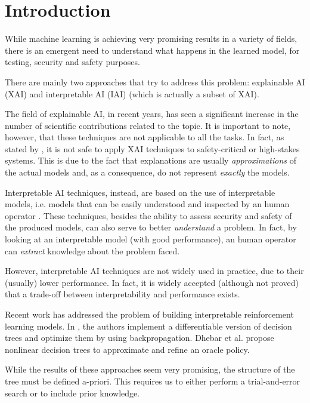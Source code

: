 \documentclass[review,english]{elsarticle}
\begin{document}
\section{Introduction}
\label{sec:intro}
While machine learning is achieving very promising results in a variety of fields, there is an emergent need to understand what happens in the learned model, for testing, security and safety purposes.

There are mainly two approaches that try to address this problem: explainable AI (XAI) and interpretable AI (IAI) (which is actually a subset of XAI).

The field of explainable AI, in recent years, has seen a significant increase in the number of scientific contributions related to the topic. 
It is important to note, however, that these techniques are not applicable to all the tasks.
In fact, as stated by \cite{rudin_stop_2019}, it is not safe to apply XAI techniques to safety-critical or high-stakes systems.
This is due to the fact that explanations are usually \textit{approximations} of the actual models and, as a consequence, do not represent \textit{exactly} the models.

Interpretable AI techniques, instead, are based on the use of interpretable models, i.e. models that can be easily understood and inspected by an human operator \cite{barredo_arrieta_explainable_2020}.
These techniques, besides the ability to assess security and safety of the produced models, can also serve to better \textit{understand} a problem.
In fact, by looking at an interpretable model (with good performance), an human operator can \textit{extract} knowledge about the problem faced.

However, interpretable AI techniques are not widely used in practice, due to their (usually) lower performance.
In fact, it is widely accepted (although not proved) that a trade-off between interpretability and performance exists.

Recent work has addressed the problem of building interpretable reinforcement learning models.
In \cite{silva_optimization_2020}, the authors implement a differentiable version of decision trees and optimize them by using backpropagation.
Dhebar et al. \cite{dhebar_interpretable-ai_2020} propose nonlinear decision trees to approximate and refine an oracle policy.

While the results of these approaches seem very promising, the structure of the tree must be defined a-priori.
This requires us to either perform a trial-and-error search or to include prior knowledge.
\end{document}
